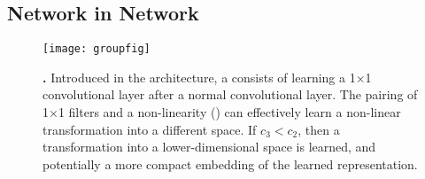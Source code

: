 \documentclass[thesis]{subfiles}
\begin{document}
\subsection{Network in Network}
\begin{figure}[tbp]
    \centering
    \texttt{[image: groupfig]}
    \caption[Low-dimensional embedding]{\textbf{.} Introduced in the  architecture, a  consists of learning a 1$\times$1 convolutional layer after a normal convolutional layer. The pairing of 1$\times$1 filters and a non-linearity (\ie {}) can effectively learn a non-linear transformation into a different space. If $c_3 < c_2$, then a transformation into a lower-dimensional space is learned, and potentially a more compact embedding of the learned representation.}\label{fig:lowdimembedding}
\end{figure}
\end{document}
